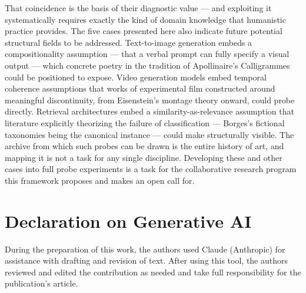 \documentclass[
  twocolumn,
]{ceurart}
\begin{document}
That coincidence is the basis of their diagnostic value — and exploiting it systematically requires exactly the kind of domain knowledge that humanistic practice provides. The five cases presented here also indicate future potential structural fields to be addressed. Text-to-image generation embeds a compositionality assumption — that a verbal prompt can fully specify a visual output — which concrete poetry in the tradition of Apollinaire's Calligrammes could be positioned to expose. Video generation models embed temporal coherence assumptions that works of experimental film constructed around meaningful discontinuity, from Eisenstein's montage theory onward, could probe directly. Retrieval architectures embed a similarity-as-relevance assumption that literature explicitly theorizing the failure of classification — Borges's fictional taxonomies being the canonical instance — could make structurally visible. The archive from which such probes can be drawn is the entire history of art, and mapping it is not a task for any single discipline. Developing these and other cases into full probe experiments is a task for the collaborative research program this framework proposes and makes an open call for.

\section*{Declaration on Generative AI}
During the preparation of this work, the authors used Claude (Anthropic) for assistance with drafting and revision of text. After using this tool, the authors reviewed and edited the contribution as needed and take full responsibility for the publication's article.


\end{document}
